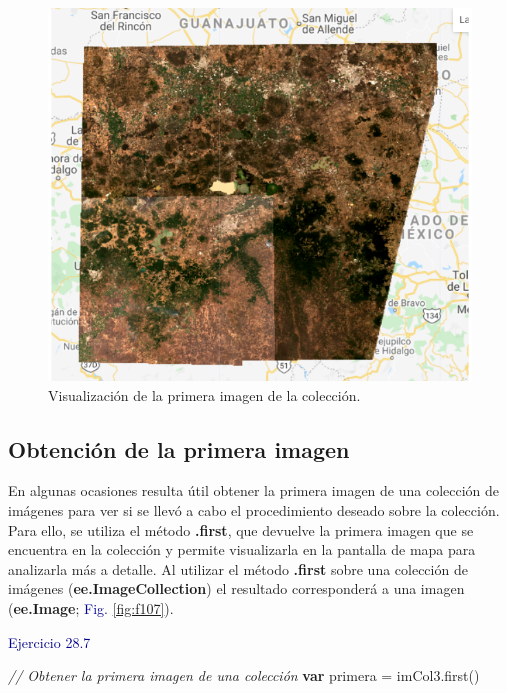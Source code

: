 \documentclass[
  12pt,
  letterpaper,
  twoside]{book}
\newenvironment{Shaded}{\begin{snugshade}}{\end{snugshade}}
\newcommand{\CommentTok}[1]{\textcolor[rgb]{0.24,0.58,0.00}{\textit{#1}}}
\newcommand{\FunctionTok}[1]{\textcolor[rgb]{0.48,0.12,0.64}{#1}}
\newcommand{\KeywordTok}[1]{\textcolor[rgb]{0.00,0.00,0.00}{\textbf{#1}}}
\newcommand{\NormalTok}[1]{#1}
\newcommand{\OperatorTok}[1]{\textcolor[rgb]{0.00,0.00,0.00}{#1}}
\newcommand\boldpurple[1]{\textcolor{darkpurple}{\textbf{#1}}}
\begin{document}
\begin{figure}[H]

{\centering \includegraphics[width=0.8\linewidth]{Img/imcol5sortcloud} 

}

\caption{Visualización de la primera imagen de la colección.}\label{fig:f106}
\end{figure}

\hypertarget{obtenciuxf3n-de-la-primera-imagen}{%
\subsection*{Obtención de la primera imagen}\label{obtenciuxf3n-de-la-primera-imagen}}

En algunas ocasiones resulta útil obtener la primera imagen de una colección de imágenes para ver si se llevó a cabo el procedimiento deseado sobre la colección. Para ello, se utiliza el método \boldpurple{.first}, que devuelve la primera imagen que se encuentra en la colección y permite visualizarla en la pantalla de mapa para analizarla más a detalle. Al utilizar el método \boldpurple{.first} sobre una colección de imágenes (\boldpurple{ee.ImageCollection}) el resultado corresponderá a una imagen (\boldpurple{ee.Image}; \textcolor{darkblue}{Fig. } \ref{fig:f107}).

\textcolor{darkblue}{Ejercicio 28.7}

\begin{Shaded}
\begin{Highlighting}[]
\CommentTok{// Obtener la primera imagen de una colección}
\KeywordTok{var}\NormalTok{ primera }\OperatorTok{=}\NormalTok{ imCol3}\OperatorTok{.}\FunctionTok{first}\NormalTok{()}
\end{Highlighting}
\end{Shaded}
\end{document}
